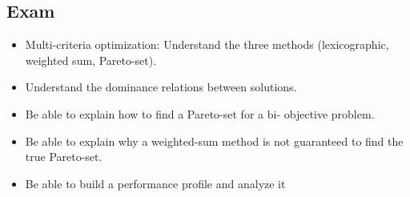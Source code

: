 \subsection{Exam}
\begin{itemize}
    \item Multi-criteria optimization: Understand the three
        methods (lexicographic, weighted sum, Pareto-set).
    \item  Understand the dominance relations between
        solutions.
    \item  Be able to explain how to find a Pareto-set for a bi-
        objective problem.
    \item  Be able to explain why a weighted-sum method is not
        guaranteed to find the true Pareto-set.
    \item  Be able to build a performance profile and analyze it
\end{itemize}

